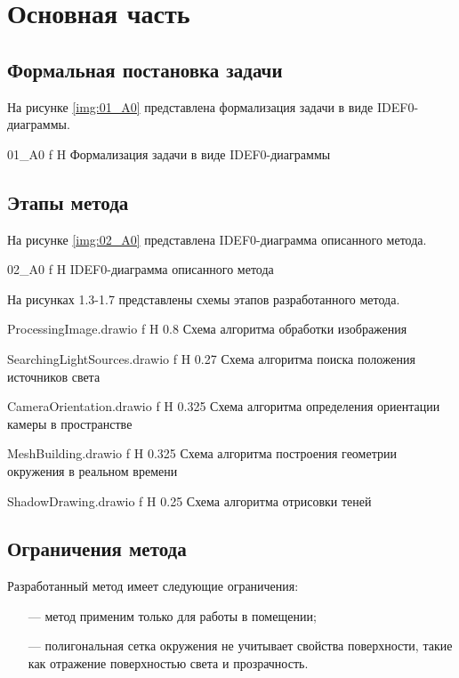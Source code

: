 \chapter{Основная часть}

\section{Формальная постановка задачи}

На рисунке \ref{img:01_A0} представлена формализация задачи в виде IDEF0-диаграммы.

{01_A0}
{f}
{H}
{\textwidth}
{Формализация задачи в виде IDEF0-диаграммы}

\section{Этапы метода}

На рисунке \ref{img:02_A0} представлена IDEF0-диаграмма описанного метода.

{02_A0}
{f}
{H}
{\textwidth}
{IDEF0-диаграмма описанного метода}

На рисунках 1.3-1.7 представлены схемы этапов разработанного метода.

{ProcessingImage.drawio}
{f}
{H}
{0.8\textwidth}
{Схема алгоритма обработки изображения}

{SearchingLightSources.drawio}
{f}
{H}
{0.27\textwidth}
{Схема алгоритма поиска положения источников света}

{CameraOrientation.drawio}
{f}
{H}
{0.325\textwidth}
{Схема алгоритма определения ориентации камеры в пространстве}

{MeshBuilding.drawio}
{f}
{H}
{0.325\textwidth}
{Схема алгоритма построения геометрии окружения в реальном времени}

{ShadowDrawing.drawio}
{f}
{H}
{0.25\textwidth}
{Схема алгоритма отрисовки теней}

\section{Ограничения метода}

Разработанный метод имеет следующие ограничения:

\begin{itemize}
	\item[---] метод применим только для работы в помещении;
	\item[---] полигональная сетка окружения не учитывает свойства поверхности, такие как отражение поверхностью света и прозрачность.
\end{itemize}

